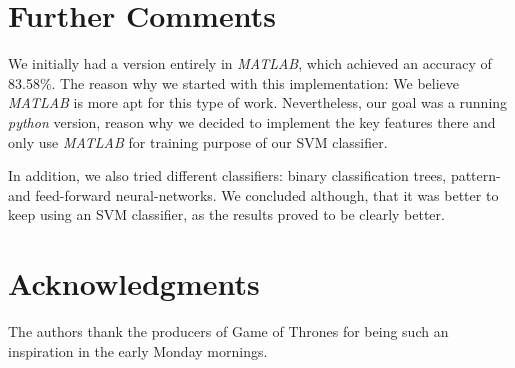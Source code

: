 \documentclass[10pt,conference,compsocconf]{IEEEtran}
\begin{document}
\section*{Further Comments}

We initially had a version entirely in \emph{MATLAB}, which achieved an accuracy of 83.58\%. The reason why we started with this implementation: We believe \emph{MATLAB} is more apt for this type of work. Nevertheless, our goal was a running \emph{python} version, reason why we decided to implement the key features there and only use \emph{MATLAB} for training purpose of our SVM classifier.

In addition, we also tried different classifiers: binary classification trees, pattern- and feed-forward neural-networks. We concluded although, that it was better to keep using an SVM classifier, as the results proved to be clearly better.

\section*{Acknowledgments}
The authors thank the producers of Game of Thrones for being such an inspiration in the early Monday mornings.



\end{document}
